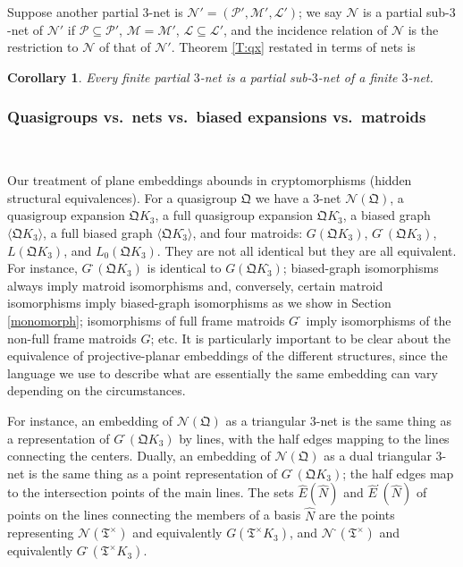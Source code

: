 \documentclass[reqno,12pt]{amsart}
\newtheorem{cor}[thm]{Corollary}
\theoremstyle{remark}
\numberwithin{equation}{section}
\numberwithin{figure}{section}
\newcommand \bgr[1]{\langle#1\rangle}
\newcommand \full{^{{}^{{}_{{}_\bullet}}\!}}
\renewcommand \cL{\mathcal{L}}	%
\newcommand \cM{\mathcal{M}}
\newcommand \cN{\mathcal{N}}
\newcommand \cP{\mathcal{P}}
\newcommand \fQ{\mathfrak Q}
\newcommand \fT{\mathfrak T}
\newcommand \hE{{\hat E}}
\newcommand \hN{{\hat N}}
\newcommand\G{{G\full}}
\begin{document}
Suppose another partial $3$-net is $\cN'=(\cP',\cM',\cL')$; we say $\cN$ is a partial sub-$3$-net of $\cN'$ if $\cP \subseteq \cP'$, $\cM=\cM'$, $\cL\subseteq \cL'$, and the incidence relation of $\cN$ is the restriction to $\cN$ of that of $\cN'$.  Theorem \ref{T:qx} restated in terms of nets is

\begin{cor}\label{C:p3net}
Every finite partial $3$-net is a partial sub-$3$-net of a finite $3$-net.
\end{cor}


\subsubsection{Quasigroups vs.\ nets vs.\ biased expansions vs.\ matroids}\label{qnbxm}\

Our treatment of plane embeddings abounds in cryptomorphisms (hidden structural equivalences).  For a quasigroup $\fQ$ we have a $3$-net $\cN(\fQ)$, a quasigroup expansion $\fQ K_3$, a full quasigroup expansion $\fQ K_3\full$, a biased graph $\bgr{\fQ K_3}$, a full biased graph $\bgr{\fQ K_3\full}$, and four matroids: $G(\fQ K_3)$, $\G(\fQ K_3)$, $L(\fQ K_3)$, and $L_0(\fQ K_3)$.  They are not all identical but they are all equivalent.  For instance, $\G(\fQ K_3)$ is identical to $G(\fQ K_3\full)$; biased-graph isomorphisms always imply matroid isomorphisms and, conversely, certain matroid isomorphisms imply biased-graph isomorphisms as we show in Section \ref{monomorph}; isomorphisms of full frame matroids $\G$ imply isomorphisms of the non-full frame matroids $G$; etc.  It is particularly important to be clear about the equivalence of projective-planar embeddings of the different structures, since the language we use to describe what are essentially the same embedding can vary depending on the circumstances.

For instance, an embedding of $\cN(\fQ)$ as a triangular $3$-net is the same thing as a representation of $\G(\fQ K_3)$ by lines, with the half edges mapping to the lines connecting the centers.  
Dually, an embedding of $\cN(\fQ)$ as a dual triangular $3$-net is the same thing as a point representation of $\G(\fQ K_3)$; the half edges map to the intersection points of the main lines.  
The sets $\hE(\hN)$ and $\hE\full(\hN)$ of points on the lines connecting the members of a basis $\hN$ are the points representing $\cN(\fT^\times)$ and equivalently $G(\fT^\times K_3)$, and $\cN\full(\fT^\times)$ and equivalently $\G(\fT^\times K_3)$.
\end{document}
